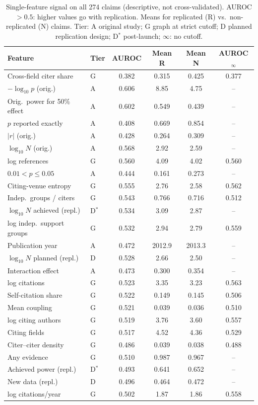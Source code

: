 \begin{table}[t]\centering\caption{Single-feature signal on all 274 claims (descriptive, not cross-validated). AUROC $>0.5$: higher values go with replication. Means for replicated (R) vs.\ non-replicated (N) claims. Tier: A original study; G graph at strict cutoff; D planned replication design; D$^{*}$ post-launch; $\infty$: no cutoff.}\label{tab:feat}
\scriptsize\setlength{\tabcolsep}{3pt}\begin{tabular}{@{}llcccc@{}}\toprule
Feature & Tier & AUROC & Mean R & Mean N & AUROC$_\infty$ \\\midrule
Cross-field citer share & G & 0.382 & 0.315 & 0.425 & 0.377 \\
$-\log_{10} p$ (orig.) & A & 0.606 & 8.85 & 4.75 & -- \\
Orig.\ power for 50\% effect & A & 0.602 & 0.549 & 0.439 & -- \\
$p$ reported exactly & A & 0.408 & 0.669 & 0.854 & -- \\
$|r|$ (orig.) & A & 0.428 & 0.264 & 0.309 & -- \\
$\log_{10} N$ (orig.) & A & 0.568 & 2.92 & 2.59 & -- \\
log references & G & 0.560 & 4.09 & 4.02 & 0.560 \\
$0.01<p\le0.05$ & A & 0.444 & 0.161 & 0.273 & -- \\
Citing-venue entropy & G & 0.555 & 2.76 & 2.58 & 0.562 \\
Indep.\ groups / citers & G & 0.543 & 0.766 & 0.716 & 0.512 \\
$\log_{10} N$ achieved (repl.) & D$^{*}$ & 0.534 & 3.09 & 2.87 & -- \\
log indep.\ support groups & G & 0.532 & 2.94 & 2.79 & 0.559 \\
Publication year & A & 0.472 & 2012.9 & 2013.3 & -- \\
$\log_{10} N$ planned (repl.) & D & 0.528 & 2.66 & 2.50 & -- \\
Interaction effect & A & 0.473 & 0.300 & 0.354 & -- \\
log citations & G & 0.523 & 3.35 & 3.23 & 0.563 \\
Self-citation share & G & 0.522 & 0.149 & 0.145 & 0.506 \\
Mean coupling & G & 0.521 & 0.039 & 0.036 & 0.510 \\
log citing authors & G & 0.519 & 3.76 & 3.60 & 0.557 \\
Citing fields & G & 0.517 & 4.52 & 4.36 & 0.529 \\
Citer--citer density & G & 0.486 & 0.039 & 0.038 & 0.488 \\
Any evidence & G & 0.510 & 0.987 & 0.967 & -- \\
Achieved power (repl.) & D$^{*}$ & 0.493 & 0.641 & 0.652 & -- \\
New data (repl.) & D & 0.496 & 0.464 & 0.472 & -- \\
log citations/year & G & 0.502 & 1.87 & 1.86 & 0.558 \\
\bottomrule\end{tabular}\end{table}
